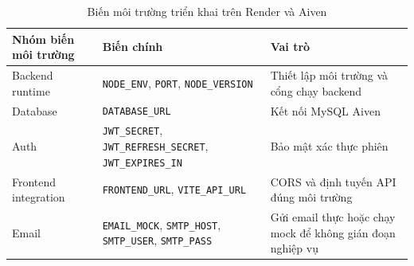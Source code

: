 \documentclass[12pt,a4paper]{report}
\begin{document}
\begin{table}[H]
\centering
\small
\begin{tabular}{|L{3.8cm}|L{4.2cm}|L{4.7cm}|}
\hline
\textbf{Nhóm biến môi trường} & \textbf{Biến chính} & \textbf{Vai trò} \\ \hline
Backend runtime & \texttt{NODE\_ENV}, \texttt{PORT}, \texttt{NODE\_VERSION} & Thiết lập môi trường và cổng chạy backend \\ \hline
Database & \texttt{DATABASE\_URL} & Kết nối MySQL Aiven \\ \hline
Auth & \texttt{JWT\_SECRET}, \texttt{JWT\_REFRESH\_SECRET}, \texttt{JWT\_EXPIRES\_IN} & Bảo mật xác thực phiên \\ \hline
Frontend integration & \texttt{FRONTEND\_URL}, \texttt{VITE\_API\_URL} & CORS và định tuyến API đúng môi trường \\ \hline
Email & \texttt{EMAIL\_MOCK}, \texttt{SMTP\_HOST}, \texttt{SMTP\_USER}, \texttt{SMTP\_PASS} & Gửi email thực hoặc chạy mock để không gián đoạn nghiệp vụ \\ \hline
\end{tabular}
\caption{Biến môi trường triển khai trên Render và Aiven}
\end{table}
\end{document}
